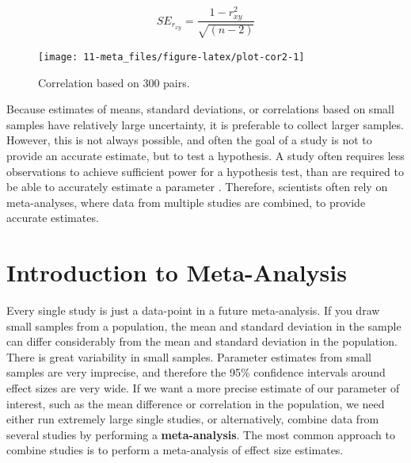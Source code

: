 \documentclass[
  oneside]{book}
\begin{document}
\[SE_{r_{xy}} = \frac{1 - r^2_{xy}}{\sqrt{(n - 2)}}\]



\begin{figure}

{\centering \texttt{[image: 11-meta\_files/figure-latex/plot-cor2-1]} 

}

\caption{Correlation based on 300 pairs.}\label{fig:plot-cor2}
\end{figure}

Because estimates of means, standard deviations, or correlations based on small samples have relatively large uncertainty, it is preferable to collect larger samples. However, this is not always possible, and often the goal of a study is not to provide an accurate estimate, but to test a hypothesis. A study often requires less observations to achieve sufficient power for a hypothesis test, than are required to be able to accurately estimate a parameter \citep{maxwell_sample_2008}. Therefore, scientists often rely on meta-analyses, where data from multiple studies are combined, to provide accurate estimates.

\hypertarget{introduction-to-meta-analysis}{%
\section{Introduction to Meta-Analysis}\label{introduction-to-meta-analysis}}

Every single study is just a data-point in a future meta-analysis. If you draw small samples from a population, the mean and standard deviation in the sample can differ considerably from the mean and standard deviation in the population. There is great variability in small samples. Parameter estimates from small samples are very imprecise, and therefore the 95\% confidence intervals around effect sizes are very wide. If we want a more precise estimate of our parameter of interest, such as the mean difference or correlation in the population, we need either run extremely large single studies, or alternatively, combine data from several studies by performing a \textbf{meta-analysis}. The most common approach to combine studies is to perform a meta-analysis of effect size estimates.
\end{document}
